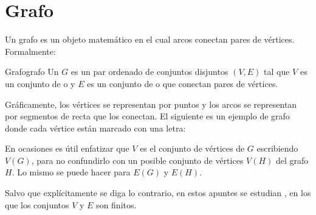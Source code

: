 \section{Grafo}
\label{sec:grafo}

Un grafo es un objeto matemático en el cual arcos conectan pares de vértices. Formalmente:

\begin{definicion}{Grafo}{grafo}
  Un  $G$ es un par ordenado de conjuntos disjuntos $(V, E)$ tal que $V$ es un conjunto de  o  y $E$ es un conjunto de  o  que conectan pares de vértices.
\end{definicion}

Gráficamente, los vértices se representan por puntos y los arcos se representan por segmentos de recta que los conectan. El siguiente es un ejemplo de grafo donde cada vértice están marcado con una letra:

\begin{center}
\end{center}

En ocasiones es útil enfatizar que $V$ es el conjunto de vértices de $G$ escribiendo $V(G)$, para no confundirlo con un posible conjunto de vértices $V(H)$ del grafo $H$. Lo mismo se puede hacer para $E(G)$ y $E(H)$.

Salvo que explícitamente se diga lo contrario, en estos apuntes se estudian , en los que los conjuntos $V$ y $E$ son finitos.
